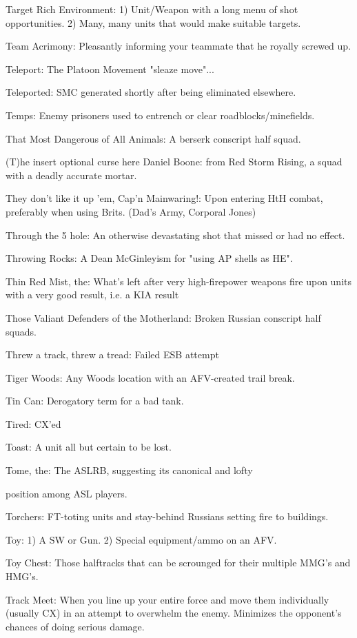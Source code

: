 \documentclass[letterpaper]{article}
\begin{document}
Target Rich Environment: 1) Unit/Weapon with a long menu of shot opportunities. 2) Many, many units that would make suitable targets.

Team Acrimony: Pleasantly informing your teammate that he royally screwed up.

Teleport: The Platoon Movement "sleaze move"...

Teleported: SMC generated shortly after being eliminated elsewhere.

Temps: Enemy prisoners used to entrench or clear roadblocks/minefields.

That Most Dangerous of All Animals: A berserk conscript half squad.

(T)he {insert optional curse here} Daniel Boone: from Red Storm Rising, a squad with a deadly accurate mortar.

They don't like it up 'em, Cap'n Mainwaring!: Upon entering HtH combat, preferably when using Brits. (Dad's Army, Corporal Jones)

Through the 5 hole: An otherwise devastating shot that missed or had no effect.

Throwing Rocks: A Dean McGinleyism for "using AP shells as HE".

Thin Red Mist, the: What's left after very high-firepower weapons fire upon units with a very good result, i.e. a KIA result

Those Valiant Defenders of the Motherland: Broken Russian conscript half squads.

Threw a track, threw a tread: Failed ESB attempt

Tiger Woods:  Any Woods location with an AFV-created trail break.

Tin Can: Derogatory term for a bad tank.

Tired: CX'ed

Toast: A unit all but certain to be lost.

Tome, the: The ASLRB, suggesting its canonical and lofty

position among ASL players.

Torchers: FT-toting units and stay-behind Russians setting fire to buildings.

Toy: 1) A SW or Gun. 2) Special equipment/ammo on an AFV.

Toy Chest: Those halftracks that can be scrounged for their multiple MMG's and HMG's.

Track Meet: When you line up your entire force and move them individually (usually CX) in an attempt to overwhelm the enemy. Minimizes the opponent's chances of doing serious damage.
\end{document}
